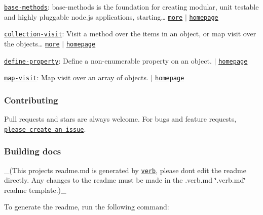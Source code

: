 \begin{DoxyItemize}
\item \href{https://www.npmjs.com/package/base-methods}{\tt base-\/methods}\+: base-\/methods is the foundation for creating modular, unit testable and highly pluggable node.\+js applications, starting… \href{https://github.com/jonschlinkert/base-methods}{\tt more} $\vert$ \href{https://github.com/jonschlinkert/base-methods}{\tt homepage}
\item \href{https://www.npmjs.com/package/collection-visit}{\tt collection-\/visit}\+: Visit a method over the items in an object, or map visit over the objects… \href{https://github.com/jonschlinkert/collection-visit}{\tt more} $\vert$ \href{https://github.com/jonschlinkert/collection-visit}{\tt homepage}
\item \href{https://www.npmjs.com/package/define-property}{\tt define-\/property}\+: Define a non-\/enumerable property on an object. $\vert$ \href{https://github.com/jonschlinkert/define-property}{\tt homepage}
\item \href{https://www.npmjs.com/package/map-visit}{\tt map-\/visit}\+: Map {\ttfamily visit} over an array of objects. $\vert$ \href{https://github.com/jonschlinkert/map-visit}{\tt homepage}
\end{DoxyItemize}

\subsubsection*{Contributing}

Pull requests and stars are always welcome. For bugs and feature requests, \href{../../issues/new}{\tt please create an issue}.

\subsubsection*{Building docs}

\+\_\+(This project\textquotesingle{}s readme.\+md is generated by \href{https://github.com/verbose/verb-generate-readme}{\tt verb}, please don\textquotesingle{}t edit the readme directly. Any changes to the readme must be made in the .verb.\+md \char`\"{}.\+verb.\+md\char`\"{} readme template.)\+\_\+

To generate the readme, run the following command\+:




